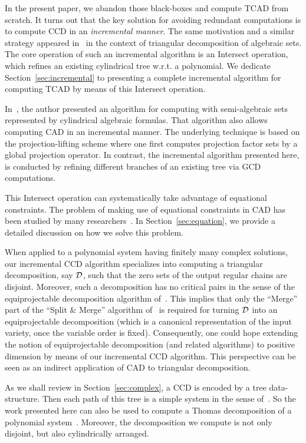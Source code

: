\documentclass[10pt]{article}
\newcommand{\TCAD}{{\sc TCAD}}
\begin{document}
In the present paper, 
we abandon those black-boxes and compute {\TCAD} from scratch. 
It turns out that the key solution for avoiding redundant computations 
is to compute CCD in an {\em incremental manner}.
The same motivation and a similar strategy
appeared in~\cite{moreno00, CM11} in the context of
triangular decomposition of algebraic sets.
The core operation of such an incremental algorithm 
is an {\sf Intersect} operation, 
which refines an existing cylindrical tree 
w.r.t. a polynomial.
We dedicate Section~\ref{sec:incremental} to presenting a complete 
incremental algorithm for computing {\TCAD} 
by means of this {\sf Intersect} operation.


In~\cite{Strzebonski2010a}, the author
presented an algorithm for computing 
with semi-algebraic sets represented by cylindrical algebraic formulas. 
That algorithm also allows computing CAD in an incremental manner.
The underlying technique is based on the projection-lifting 
scheme where one first computes projection factor sets by 
a global projection operator. 
In contrast, 
the incremental algorithm presented here, 
is conducted by refining different branches 
of an existing tree via GCD computations. 


This {\sf Intersect} operation can systematically take advantage of equational constraints. 
The problem of making use of equational constraints in CAD has been 
studied by many researchers~\cite{Collins98, McCallum2001, Brown05, McCallum2009}.
In Section~\ref{sec:equation},
we provide a detailed discussion on how we solve 
this problem.

When  applied to a polynomial system 
having finitely many complex solutions, our incremental CCD algorithm
specializes into computing a triangular decomposition,
say ${\cal D}$, 
such that the zero sets of the output regular chains are
disjoint.
Moreover, such a decomposition 
has no critical pairs in the sense of the 
equiprojectable decomposition algorithm of~\cite{DMSWX05a}.
This implies that only the ``Merge'' part of the 
``Split \& Merge'' algorithm of~\cite{DMSWX05a}
is required for turning ${\cal D}$ into an
 equiprojectable decomposition (which is a canonical
representation of the input variety, once the variable order is fixed).
Consequently, one could hope extending the
notion of equiprojectable decomposition (and related algorithms) 
to positive dimension by means of our incremental CCD algorithm.
This perspective can be seen as an indirect application 
of CAD to triangular decomposition.

As we shall review in Section~\ref{sec:complex}, 
a CCD is encoded by a tree data-structure.
 Then each path of this tree is a simple system
in the sense of~\cite{Thomas37, Wang98a}.
So the work presented here can also be used to 
compute a Thomas decomposition of a polynomial system~\cite{Wang98a, Thomas10}. 
Moreover, the decomposition we compute is not only disjoint, 
but also cylindrically arranged. 
\end{document}
